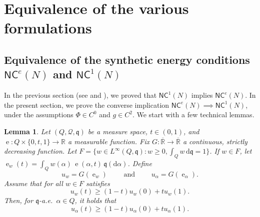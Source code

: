 \documentclass[12pt,a4paper]{amsart}
\theoremstyle{plain}
\newtheorem{lemma}{Lemma}[section]
\theoremstyle{definition}
\numberwithin{equation}{section}
\newcommand{\R}{\mathbb{R}}
\DeclareMathOperator{\ee}{e}
\newcommand{\de}{{\mathrm{d}}}
\newcommand{\NC}{\mathsf{NC}}
\newcommand{\q}{\mathfrak{q}}
\newcommand{\qq}{\mathfrak q}
\begin{document}
\section{Equivalence of the various formulations}\label{S:converse}

\subsection{Equivalence of the synthetic energy conditions $\NC^e(N)$ and $\NC^1(N)$}

In the previous section (see  and ), we proved that $\NC^1(N)$ implies $\NC^e(N)$. In the present section, we prove the converse implication  
$\NC^e(N)\implies \NC^1(N)$, under 
the  assumptions 
$\Phi\in C^0$ and $g\in C^2$.
We start with a few technical lemmas.

\begin{lemma}
  \label{lem:mixture-riccati}
  Let $(Q, \mathcal{Q}, \qq)$ be a measure space, $t\in (0,1)$, and
  $\ee:Q\times \{0,t,1\}\to \R$ a measurable function.
  Fix $G:\overline{\R}\to\overline{\R}$ a continuous, strictly
  decreasing function.
  Let $F=\{w\in L^\infty(Q,\q): w\geq 0, \int_Q w\,\de\q=1\}$.
  If $w\in F$, let $\ee_w(t)=\int_Q w(\alpha)\,
  \ee(\alpha, t)\,\q(\de\alpha)$.
  Define
  \begin{equation}
    u_w= G(\ee_w)
    \qquad
    \text{ and }
    \qquad
    u_\alpha=
    G(\ee_\alpha)
    .
  \end{equation}
  Assume that for all
  $w\in F$ satisfies
  \begin{equation}
    u_w(t)
    \geq
    (1-t)
    u_w(0)
    +
    t
    u_w(1)    .
  \end{equation}
  Then, for $\q$-a.e.\ $\alpha\in Q$, it holds that
    \begin{equation}
    u_\alpha(t)
    \geq
    (1-t)
    u_\alpha(0)
    +
    t
    u_\alpha(1)    .
  \end{equation}  
\end{lemma}
\end{document}
